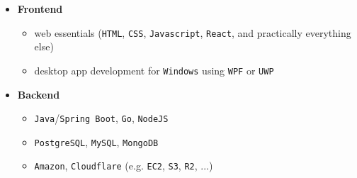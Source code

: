 \documentclass[]{article}
\begin{document}
\vspace{5pt}
\begin{minipage}[t]{0.49\linewidth}
    \begin{itemize}[leftmargin=0.15in, rightmargin=0.15in, label={}]
        \item {\large\bfseries Frontend}

            \begin{itemize}
                \item web essentials (\verb|HTML|, \verb|CSS|, \verb|Javascript|, \verb|React|, and practically everything else)
                \item desktop app development for \verb|Windows| using \verb|WPF| or \verb|UWP|
            \end{itemize}
    \end{itemize}
\end{minipage}
\hspace{10pt}
\begin{minipage}[t]{0.49\linewidth}
    \begin{itemize}[leftmargin=0.15in, rightmargin=0.15in, label={}]
        \item {\large\bfseries Backend}
            \begin{itemize}
                \item \verb|Java|/\verb|Spring Boot|, \verb|Go|, \verb|NodeJS|
                \item \verb|PostgreSQL|, \verb|MySQL|, \verb|MongoDB|
                \item \verb|Amazon|, \verb|Cloudflare| (e.g. \verb|EC2|, \verb|S3|, \verb|R2|, ...)
            \end{itemize}
    \end{itemize}
\end{minipage}
\\[20pt]
\end{document}
